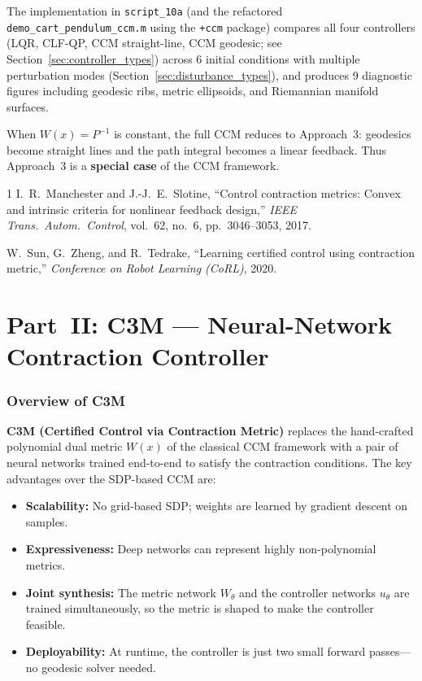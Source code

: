 \documentclass[11pt,a4paper]{article}
\begin{document}
The implementation in \texttt{script\_10a} (and the refactored \texttt{demo\_cart\_pendulum\_ccm.m} using the \texttt{+ccm} package) compares all four controllers (LQR, CLF-QP, CCM straight-line, CCM geodesic; see Section~\ref{sec:controller_types}) across 6 initial conditions with multiple perturbation modes (Section~\ref{sec:disturbance_types}), and produces 9 diagnostic figures including geodesic ribs, metric ellipsoids, and Riemannian manifold surfaces.

When \(W(x) = P^{-1}\) is constant, the full CCM reduces to Approach~3: geodesics become straight lines and the path integral becomes a linear feedback. Thus Approach~3 is a \textbf{special case} of the CCM framework.

\begin{thebibliography}{1}
I.~R.~Manchester and J.-J.~E.~Slotine,
``Control contraction metrics: Convex and intrinsic criteria for nonlinear feedback design,''
\emph{IEEE Trans.\ Autom.\ Control}, vol.~62, no.~6, pp.~3046--3053, 2017.

W.~Sun, G.~Zheng, and R.~Tedrake,
``Learning certified control using contraction metric,''
\emph{Conference on Robot Learning (CoRL)}, 2020.
\end{thebibliography}

\newpage
\part*{Part~II: C3M --- Neural-Network Contraction Controller}

\section{Overview of C3M}
\label{sec:c3m_overview}

\textbf{C3M (Certified Control via Contraction Metric)} \cite{sun2020c3m} replaces the hand-crafted polynomial dual metric \(W(x)\) of the classical CCM framework with a pair of neural networks trained end-to-end to satisfy the contraction conditions.  The key advantages over the SDP-based CCM are:

\begin{itemize}[leftmargin=2em]
    \item \textbf{Scalability:} No grid-based SDP; weights are learned by gradient descent on samples.
    \item \textbf{Expressiveness:} Deep networks can represent highly non-polynomial metrics.
    \item \textbf{Joint synthesis:} The metric network \(W_\theta\) and the controller networks \(u_{\theta}\) are trained simultaneously, so the metric is shaped to make the controller feasible.
    \item \textbf{Deployability:} At runtime, the controller is just two small forward passes---no geodesic solver needed.
\end{itemize}
\end{document}
